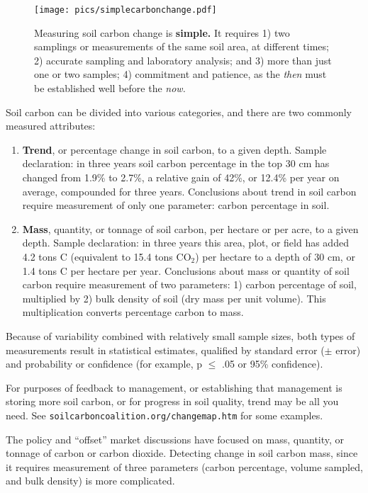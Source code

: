 \documentclass[11pt,letterpaper,oneside,onecolumn]{memoir}
\begin{document}
\begin{figure}
\centering
\texttt{[image: pics/simplecarbonchange.pdf]}
\caption{Measuring soil carbon change is \textbf{simple.} It requires 1) two samplings or measurements of the same soil area, at different times; 2) accurate sampling and laboratory analysis; and 3) more than just one or two samples; 4) commitment and patience, as the \textit{then} must be established well before the \textit{now.}}
\end{figure}

Soil carbon can be divided into various categories, and there are two commonly measured attributes:
\begin{enumerate}

\item \textbf{Trend}, or percentage change in soil carbon, to a given depth. Sample declaration: in three years soil carbon percentage in the top 30 cm has changed from 1.9\% to 2.7\%, a relative gain of 42\%, or 12.4\% per year on average, compounded for three years. Conclusions about trend in soil carbon require measurement of only one parameter: carbon percentage in soil.

\item \textbf{Mass}, quantity, or tonnage of soil carbon, per hectare or per acre, to a given depth. Sample declaration: in three years this area, plot, or field has added 4.2 tons C (equivalent to 15.4 tons CO$_{2}$) per hectare to a depth of 30 cm, or 1.4 tons C per hectare per year. Conclusions about mass or quantity of soil carbon require measurement of two parameters: 1) carbon percentage of soil, multiplied by 2) bulk density of soil (dry mass per unit volume). This multiplication converts percentage carbon to mass.
\end{enumerate}

Because of variability combined with relatively small sample sizes, both types of measurements result in statistical estimates, qualified by standard error ($\pm$ error) and probability or confidence (for example, p $\le$ .05 or 95\% confidence).

For purposes of feedback to management, or establishing that management is storing more soil carbon, or for progress in soil quality, trend may be all you need. See \texttt{soilcarboncoalition.org/changemap.htm} for some examples.

The policy and ``offset'' market discussions have focused on mass, quantity, or tonnage of carbon or carbon dioxide. Detecting change in soil carbon mass, since it requires measurement of three parameters (carbon percentage, volume sampled, and bulk density) is more complicated.
\end{document}
